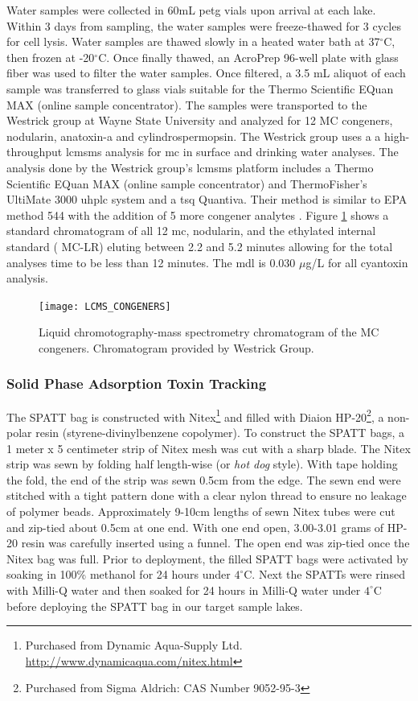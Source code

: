 Water samples were collected in 60mL \gls{petg} vials upon arrival at each lake. Within 3 days from sampling, the water samples were freeze-thawed for 3 cycles for cell lysis. Water samples are thawed slowly in a heated water bath at 37$^\circ$C, then frozen at -20$^\circ$C. Once finally thawed, an AcroPrep 96-well plate with glass fiber was used to filter the water samples. Once filtered, a 3.5 mL aliquot of each sample was transferred to glass vials suitable for the Thermo Scientific EQuan MAX (online sample concentrator). The samples were transported to the Westrick group at Wayne State University and analyzed for 12 MC congeners, nodularin, anatoxin-a and cylindrospermopsin.  The Westrick group uses a a high-throughput \gls{lcmsms} analysis for \gls{mc} in surface and drinking water analyses.
The analysis done by the Westrick group's \gls{lcmsms} platform includes a Thermo Scientific EQuan MAX (online sample concentrator) and ThermoFisher’s UltiMate 3000 \gls{uhplc} system and a \gls{tsq} Quantiva.
Their method is similar to EPA method 544 with the addition of 5 more congener analytes \cite{shoemaker_method_2015}. Figure \ref{fig:spectra} shows a standard chromatogram of all 12 \gls{mc}, nodularin, and the ethylated internal standard (\ch{[C_2D_5]} MC-LR) eluting between 2.2 and 5.2 minutes allowing for the total analyses time to be less than 12 minutes.  The \gls{mdl} is 0.030  $\mu$g/L  for all cyantoxin analysis. 

\begin{figure}[!b]
\centering
\texttt{[image: LCMS\_CONGENERS]}
\caption{Liquid chromotography-mass spectrometry chromatogram of the MC congeners. Chromatogram provided by Westrick Group.}
\label{fig:spectra}
\end{figure}



\subsubsection{Solid Phase Adsorption Toxin Tracking}

The SPATT bag is constructed with Nitex\footnote{Purchased from Dynamic Aqua-Supply Ltd.  \url{http://www.dynamicaqua.com/nitex.html}} and filled with Diaion\texttrademark \: HP-20\footnote{Purchased from Sigma Aldrich: CAS Number 9052-95-3}, a non-polar resin (styrene-divinylbenzene copolymer). To construct the SPATT bags, a 1 meter x 5 centimeter strip of Nitex mesh was cut with a sharp blade. The Nitex strip was sewn by folding half length-wise (or \emph{hot dog} style). With tape holding the fold, the end of the strip was sewn 0.5cm from the edge. The sewn end were stitched with a tight pattern done with a clear nylon thread to ensure no leakage of polymer beads. Approximately 9-10cm lengths of sewn Nitex tubes were cut and zip-tied about 0.5cm at one end. With one end open, 3.00-3.01 grams of HP-20 resin was carefully inserted using a funnel. The open end was zip-tied once the Nitex bag was full. Prior to deployment, the filled SPATT bags were activated by soaking in 100\% methanol for 24 hours under $4^\circ$C. Next the SPATTs were rinsed with Milli-Q water and then soaked for 24 hours in Milli-Q water under $4^\circ$C before deploying the SPATT bag in our target sample lakes.


